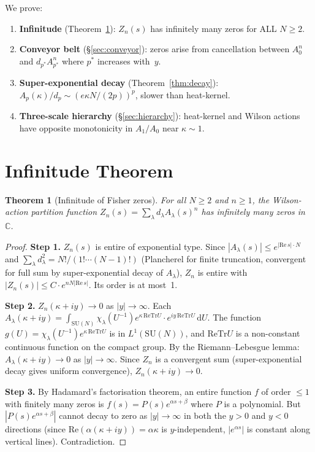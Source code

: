 \documentclass[12pt]{article}
\newtheorem{theorem}{Theorem}
\theoremstyle{definition}
\theoremstyle{remark}
\newcommand{\SU}{\mathrm{SU}}
\newcommand{\Tr}{\mathrm{Tr}}
\newcommand{\dU}{\,\mathrm{d}U}
\begin{document}
We prove:
\begin{enumerate}
  \item \textbf{Infinitude} (Theorem~\ref{thm:infinitude}): $Z_n(s)$ has
  infinitely many zeros for ALL $N \geq 2$.
  \item \textbf{Conveyor belt} (\S\ref{sec:conveyor}): zeros arise from
  cancellation between $A_0^n$ and $d_{p^*} A_{p^*}^n$ where $p^*$
  increases with~$y$.
  \item \textbf{Super-exponential decay} (Theorem~\ref{thm:decay}):
  $A_p(\kappa)/d_p \sim (e\kappa N/(2p))^p$, slower than heat-kernel.
  \item \textbf{Three-scale hierarchy} (\S\ref{sec:hierarchy}):
  heat-kernel and Wilson actions have opposite monotonicity in $A_1/A_0$
  near $\kappa \sim 1$.
\end{enumerate}


\section{Infinitude Theorem}\label{sec:infinitude}

\begin{theorem}[Infinitude of Fisher zeros]\label{thm:infinitude}
For all $N \geq 2$ and $n \geq 1$, the Wilson-action partition function
$Z_n(s) = \sum_\lambda d_\lambda A_\lambda(s)^n$ has infinitely many
zeros in~$\mathbb{C}$.
\end{theorem}

\begin{proof}
\textbf{Step 1.} $Z_n(s)$ is entire of exponential type.
Since $|A_\lambda(s)| \leq e^{|\mathrm{Re}\,s| \cdot N}$ and
$\sum_\lambda d_\lambda^2 = N!/(1! \cdots (N-1)!)$ (Plancherel for finite
truncation, convergent for full sum by super-exponential decay of $A_\lambda$),
$Z_n$ is entire with $|Z_n(s)| \leq C \cdot e^{n N |\mathrm{Re}\,s|}$.
Its order is at most~1.

\textbf{Step 2.} $Z_n(\kappa + iy) \to 0$ as $|y| \to \infty$.
Each $A_\lambda(\kappa + iy) = \int_{\SU(N)} \chi_\lambda(U^{-1})
e^{\kappa\,\mathrm{Re}\Tr U} \cdot e^{iy\,\mathrm{Re}\Tr U}\dU$.
The function $g(U) = \chi_\lambda(U^{-1}) e^{\kappa\,\mathrm{Re}\Tr U}$
is in $L^1(\SU(N))$, and $\mathrm{Re}\Tr U$ is a non-constant
continuous function on the compact group. By the Riemann--Lebesgue lemma:
$A_\lambda(\kappa + iy) \to 0$ as $|y| \to \infty$.
Since $Z_n$ is a convergent sum (super-exponential decay gives uniform
convergence), $Z_n(\kappa + iy) \to 0$.

\textbf{Step 3.} By Hadamard's factorisation theorem, an entire function
$f$ of order $\leq 1$ with finitely many zeros is $f(s) = P(s) e^{\alpha s + \beta}$
where $P$ is a polynomial. But $|P(s)e^{\alpha s + \beta}|$ cannot decay
to zero as $|y| \to \infty$ in both the $y > 0$ and $y < 0$ directions
(since $\mathrm{Re}(\alpha(\kappa + iy)) = \alpha\kappa$ is $y$-independent,
$|e^{\alpha s}|$ is constant along vertical lines). Contradiction.
\end{proof}
\end{document}

